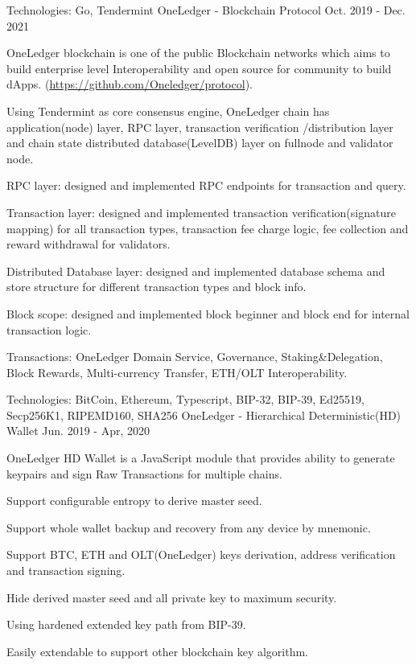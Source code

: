 \begin{cventries}
\cventry
    {Technologies: \quad Go, Tendermint}
    {OneLedger - Blockchain Protocol}
    {}
    {Oct. 2019 - Dec. 2021}
    {
      \begin{cvitems}
        \item {OneLedger blockchain is one of the public Blockchain networks which aims to build enterprise level Interoperability and open source for community to build dApps. (\url{https://github.com/Oneledger/protocol}).}
        \item {Using Tendermint as core consensus engine, OneLedger chain has application(node) layer, RPC layer, transaction verification /distribution layer and chain state distributed database(LevelDB) layer on fullnode and validator node.}
        \item {RPC layer: designed and implemented RPC endpoints for transaction and query.}
        \item {Transaction layer: designed and implemented transaction verification(signature mapping) for all transaction types, transaction fee charge logic, fee collection and reward withdrawal for validators.}
        \item {Distributed Database layer: designed and implemented database schema and store structure for different transaction types and block info.}
        \item {Block scope: designed and implemented block beginner and block end for internal transaction logic.}
        \item {Transactions: OneLedger Domain Service, Governance, Staking\&Delegation, Block Rewards, Multi-currency Transfer, ETH/OLT Interoperability.}
      \end{cvitems}
    }
    
\cventry
    {Technologies: \quad BitCoin, Ethereum, Typescript, BIP-32, BIP-39, Ed25519, Secp256K1, RIPEMD160, SHA256}
    {OneLedger - Hierarchical Deterministic(HD) Wallet}
    {}
    {Jun. 2019 - Apr, 2020}
    {
      \begin{cvitems}
        \item {OneLedger HD Wallet is a JavaScript module that provides ability to generate keypairs and sign Raw Transactions for multiple chains.}
        \item {Support configurable entropy to derive master seed.}
        \item {Support whole wallet backup and recovery from any device by mnemonic.}
        \item {Support BTC, ETH and OLT(OneLedger) keys derivation, address verification and transaction signing.}
        \item {Hide derived master seed and all private key to maximum security.}
        \item {Using hardened extended key path from BIP-39.}
        \item {Easily extendable to support other blockchain key algorithm.}
      \end{cvitems}
    }


\end{cventries}
